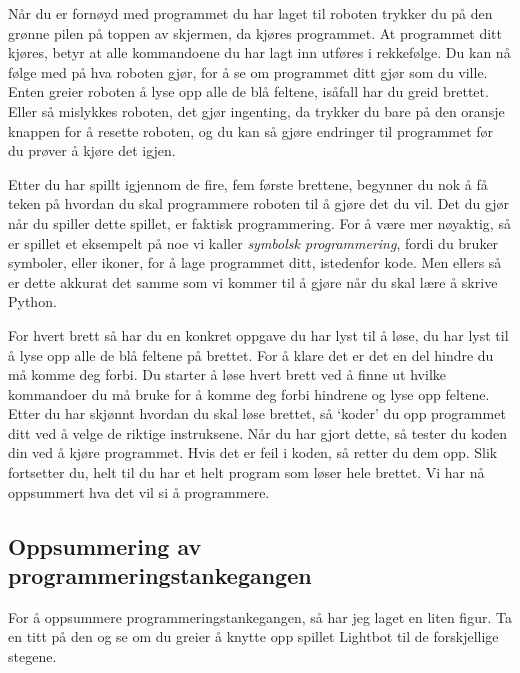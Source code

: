 \documentclass[a4paper, 11pt, notitlepage]{article}
\begin{document}
Når du er fornøyd med programmet du har laget til roboten trykker du på den grønne pilen på toppen av skjermen, da kjøres programmet. At programmet ditt kjøres, betyr at alle kommandoene du har lagt inn utføres i rekkefølge. Du kan nå følge med på hva roboten gjør, for å se om programmet ditt gjør som du ville. Enten greier roboten å lyse opp alle de blå feltene, isåfall har du greid brettet. Eller så mislykkes roboten, det gjør ingenting, da trykker du bare på den oransje knappen for å resette roboten, og du kan så gjøre endringer til programmet før du prøver å kjøre det igjen.

\clearpage

Etter du har spillt igjennom de fire, fem første brettene, begynner du nok å få teken på hvordan du skal programmere roboten til å gjøre det du vil. Det du gjør når du spiller dette spillet, er faktisk programmering. For å være mer nøyaktig, så er spillet et eksempelt på noe vi kaller \emph{symbolsk programmering}, fordi du bruker symboler, eller ikoner, for å lage programmet ditt, istedenfor kode. Men ellers så er dette akkurat det samme som vi kommer til å gjøre når du skal lære å skrive Python.

For hvert brett så har du en konkret oppgave du har lyst til å løse, du har lyst til å lyse opp alle de blå feltene på brettet. For å klare det er det en del hindre du må komme deg forbi. Du starter å løse hvert brett ved å finne ut hvilke kommandoer du må bruke for å komme deg forbi hindrene og lyse opp feltene. Etter du har skjønnt hvordan du skal løse brettet, så `koder' du opp programmet ditt ved å velge de riktige instruksene. Når du har gjort dette, så tester du koden din ved å kjøre programmet. Hvis det er feil i koden, så retter du dem opp. Slik fortsetter du, helt til du har et helt program som løser hele brettet. Vi har nå oppsummert hva det vil si å programmere.

\subsection*{Oppsummering av programmeringstankegangen}

For å oppsummere programmeringstankegangen, så har jeg laget en liten figur. Ta en titt på den og se om du greier å knytte opp spillet Lightbot til de forskjellige stegene.

\vspace{1cm}
\end{document}
